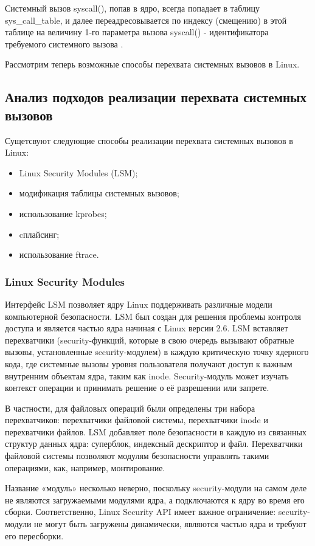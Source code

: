 \documentclass[a4paper,14pt]{article}
\begin{document}
Системный вызов syscall(), попав в ядро, всегда попадает в таблицу sys\_call\_table, и далее переадресовывается по индексу (смещению) в этой таблице на величину 1-го параметра вызова syscall() - идентификатора требуемого системного вызова \cite{zirulnik}.

Рассмотрим теперь возможные способы перехвата системных вызовов в Linux.

\subsection{Анализ подходов реализации перехвата системных вызовов}

Сущетсвуют следующие способы реализации перехвата системных вызовов в Linux:

\begin{itemize}
	\item Linux Security Modules (LSM);
	\item модификация таблицы системных вызовов;
	\item использование kprobes;
	\item cплайсинг;
	\item использование ftrace.
\end{itemize}

\subsubsection{Linux Security Modules}

Интерфейс LSM позволяет ядру Linux поддерживать различные модели компьютерной безопасности. LSM был создан для решения проблемы контроля доступа и является частью ядра начиная с Linux версии 2.6. LSM вставляет перехватчики (security-функций, которые в свою очередь вызывают обратные вызовы, установленные security-модулем) в каждую критическую точку ядерного кода, где системные вызовы уровня пользователя получают доступ к важным внутренним объектам ядра, таким как inode. Security-модуль может изучать контекст операции и принимать решение о её разрешении или запрете.

В частности, для файловых операций были определены три набора перехватчиков: перехватчики файловой системы, перехватчики inode и перехватчики файлов. LSM добавляет поле безопасности в каждую из связанных структур данных ядра: суперблок, индексный дескриптор и файл. Перехватчики файловой системы позволяют модулям безопасности управлять такими операциями, как, например, монтирование.

Название «модуль» несколько неверно, поскольку security-модули на самом деле не являются загружаемыми модулями ядра, а подключаются к ядру во время его сборки. Соответственно, Linux Security API имеет важное ограничение: security-модули не могут быть загружены динамически, являются частью ядра и требуют его пересборки. 
\end{document}
